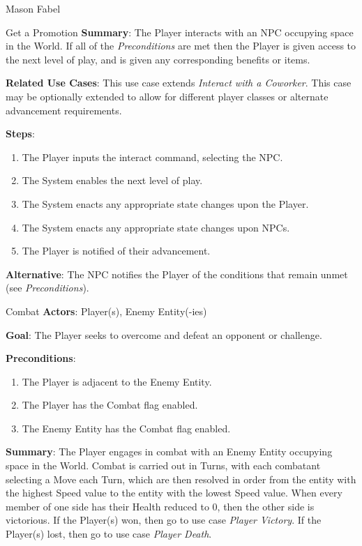 \documentclass[12pt]{report}
\begin{document}
\begin{section}{Mason Fabel}
\begin{subsection}{Get a Promotion}
\textbf{Summary}:
The Player interacts with an NPC occupying space in the World. If all of
the \textit{Preconditions} are met then the Player is given access to the
next level of play, and is given any corresponding benefits or items.

\textbf{Related Use Cases}:
This use case extends \textit{Interact with a Coworker}. This case may be
optionally extended to allow for different player classes or alternate
advancement requirements.

\textbf{Steps}:
\begin{enumerate}
\item The Player inputs the interact command, selecting the NPC.
\item The System enables the next level of play.
\item The System enacts any appropriate state changes upon the Player.
\item The System enacts any appropriate state changes upon NPCs.
\item The Player is notified of their advancement.
\end{enumerate}

\textbf{Alternative}:
The NPC notifies the Player of the conditions that remain unmet (see
\textit{Preconditions}).
\end{subsection}

\begin{subsection}{Combat}
\textbf{Actors}:
Player(s), Enemy Entity(-ies)

\textbf{Goal}:
The Player seeks to overcome and defeat an opponent or challenge.

\textbf{Preconditions}:
\begin{enumerate}
\item The Player is adjacent to the Enemy Entity.
\item The Player has the Combat flag enabled.
\item The Enemy Entity has the Combat flag enabled.
\end{enumerate}


\textbf{Summary}:
The Player engages in combat with an Enemy Entity occupying space in the
World. Combat is carried out in Turns, with each combatant selecting a Move
each Turn, which are then resolved in order from the entity with the
highest Speed value to the entity with the lowest Speed value. When every
member of one side has their Health reduced to 0, then the other side is
victorious. If the Player(s) won, then go to use case \textit{Player
Victory}. If the Player(s) lost, then go to use case \textit{Player Death}.


\end{subsection}
\end{section}
\end{document}
